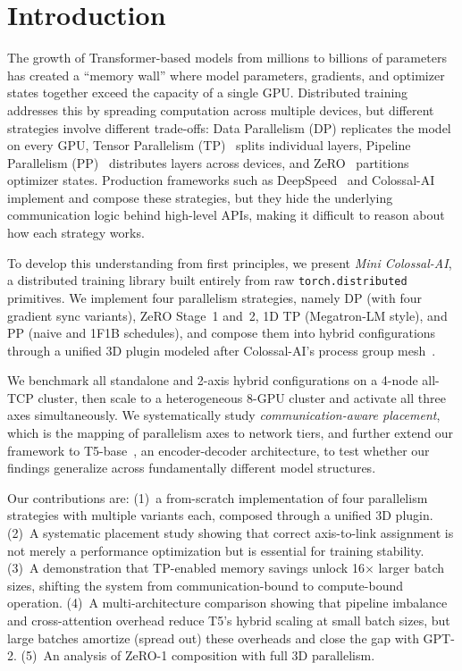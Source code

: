 \documentclass[conference]{IEEEtran}
\begin{document}
\section{Introduction}

The growth of Transformer-based models from millions to billions of parameters~\cite{DBLP:journals/corr/abs-1810-04805, DBLP:journals/corr/abs-2005-14165} has created a ``memory wall'' where model parameters, gradients, and optimizer states together exceed the capacity of a single GPU. Distributed training addresses this by spreading computation across multiple devices, but different strategies involve different trade-offs: Data Parallelism (DP) replicates the model on every GPU, Tensor Parallelism (TP)~\cite{DBLP:journals/corr/abs-1909-08053} splits individual layers, Pipeline Parallelism (PP)~\cite{DBLP:journals/corr/abs-1811-06965, 10.1145/3341301.3359646} distributes layers across devices, and ZeRO~\cite{rajbhandari2019zero} partitions optimizer states. Production frameworks such as DeepSpeed~\cite{rasley2020deepspeed} and Colossal-AI~\cite{10.1145/3605573.3605613} implement and compose these strategies, but they hide the underlying communication logic behind high-level APIs, making it difficult to reason about how each strategy works.

To develop this understanding from first principles, we present \textit{Mini Colossal-AI}, a distributed training library built entirely from raw \texttt{torch.distributed} primitives. We implement four parallelism strategies, namely DP (with four gradient sync variants), ZeRO Stage~1 and~2, 1D TP (Megatron-LM style), and PP (naive and 1F1B schedules), and compose them into hybrid configurations through a unified 3D plugin modeled after Colossal-AI's process group mesh~\cite{10.1145/3605573.3605613}.

We benchmark all standalone and 2-axis hybrid configurations on a 4-node all-TCP cluster, then scale to a heterogeneous 8-GPU cluster and activate all three axes simultaneously. We systematically study \textit{communication-aware placement}, which is the mapping of parallelism axes to network tiers, and further extend our framework to T5-base~\cite{raffel2020exploring}, an encoder-decoder architecture, to test whether our findings generalize across fundamentally different model structures.

Our contributions are: (1)~a from-scratch implementation of four parallelism strategies with multiple variants each, composed through a unified 3D plugin. (2)~A systematic placement study showing that correct axis-to-link assignment is not merely a performance optimization but is essential for training stability. (3)~A demonstration that TP-enabled memory savings unlock 16$\times$ larger batch sizes, shifting the system from communication-bound to compute-bound operation. (4)~A multi-architecture comparison showing that pipeline imbalance and cross-attention overhead reduce T5's hybrid scaling at small batch sizes, but large batches amortize (spread out) these overheads and close the gap with GPT-2. (5)~An analysis of ZeRO-1 composition with full 3D parallelism.
\end{document}
